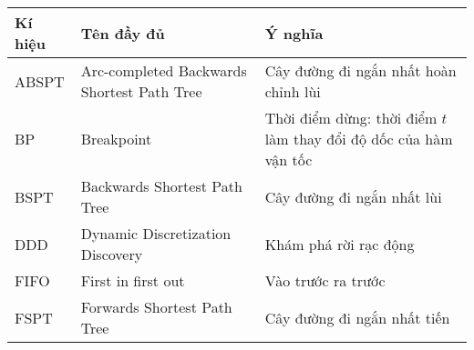\documentclass[fontsize=14pt,DIV=15pt,twoside=false]{scrbook}
\renewcommand{\arraystretch}{1.3}
\begin{document}
\begin{table}[h]
    \centering
    \small
    \renewcommand{\arraystretch}{1.1}
    \begin{tabularx}{\textwidth}{|p{1.5cm}|X|X|}
    \toprule
    \textbf{Kí hiệu} & \textbf{Tên đầy đủ}                               & \textbf{Ý nghĩa}                                                                    \\ \midrule
    ABSPT            & Arc-completed Backwards Shortest Path Tree        & Cây đường đi ngắn nhất hoàn chỉnh lùi                                               \\ \midrule
    BP               & Breakpoint                                        & Thời điểm dừng: thời điểm \(t\) làm thay đổi độ dốc của hàm vận tốc                                     \\ \midrule
    BSPT             & Backwards Shortest Path Tree                      & Cây đường đi ngắn nhất lùi                                                          \\ \midrule
    DDD              & Dynamic Discretization Discovery                  & Khám phá rời rạc động                                                               \\ \midrule
    FIFO             & First in first out                                & Vào trước ra trước                                                                  \\ \midrule
    FSPT             & Forwards Shortest Path Tree                       & Cây đường đi ngắn nhất tiến                                                         \\ \midrule

\end{tabularx}
\end{table}
\end{document}
